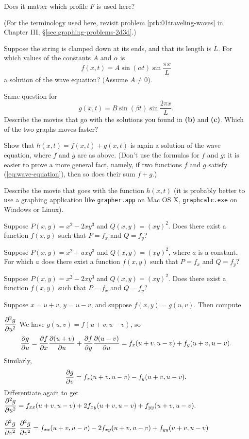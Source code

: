 \begin{multicols}{2}
Does it matter which profile $F$ is used
here?

(For the terminology used here, revisit problem
\ref{prb:01traveling-waves} in Chapter III, \S\ref{sec:graphing-problems-2d3d}.)

\subprob Suppose the string is clamped down at its ends, and that its
length is $L$.  For which values of the constants $A$ and $\alpha$ is
\[
  f(x, t) = A\sin(\alpha t) \sin \frac{\pi x}{L}
\]
a solution of the wave equation?  (Assume $A\neq0$).

\subprob Same question for 
\[
  g(x, t) =  B\sin(\beta t) \sin \frac{2\pi x}{L}.
\]
\subprob Describe the movies that go with the solutions you found in \textbf{(b)} and \textbf{(c)}.  Which of the two graphs moves faster?

\subprob Show that $h(x, t) = f(x, t)+g(x, t)$ is again a solution of the
wave equation, where $f$ and $g$ are as above.  (Don't use the formulas for
$f$ and $g$: it is easier to prove a more general fact, namely, if two
functions $f$ and $g$ satisfy (\ref{eq:wave-equation}), then so does their
sum $f+g$.)


\subprob Describe the movie that goes with the function $h(x,t)$ (it is probably better to use a graphing application like \texttt{grapher.app} on Mac OS X,
\texttt{graphcalc.exe} on Windows or Linux).

\problem Suppose $P(x, y) = x^2-2xy^3$ and $Q(x, y) = (xy)^2$.  Does  
there exist a function $f(x, y)$ such that $P= f_x$ and $Q= f_y$?

\problem Suppose $P(x, y) = x^2+axy^3$ and $Q(x, y) = (xy)^2$, where $a$  
is a constant.  For which $a$ does there exist a function $f(x, y)$ such
that $P= f_x$ and $Q= f_y$?

\problem Suppose $P(x, y) = x^2-2xy^3$ and $Q(x, y) = (xy)^2$.  Does  
there exist a function $f(x, y)$ such that $P= f_x$ and $Q= f_y$?

\problem Suppose $x=u+v$, $y=u-v$, and suppose $f(x, y) = g(u, v)$.  
Then compute

\subprob $\dfrac{\partial^2 g}{\partial u^2}$%
\answer
We have $g(u,v) = f(u+v, u-v)$, so
\[
  \frac{\partial g}{\partial u} = \frac{\partial f}{\partial x} \frac{\partial (u+v)}{\partial u} + \frac{\partial f}{\partial y} \frac{\partial (u-v)}{\partial u}
  = f_x(u+v, u-v)+f_y(u+v, u-v).
\]
Similarly,
\[
  \frac{\partial g}{\partial v} = f_x(u+v, u-v) - f_y(u+v, u-v).
\]
Differentiate again to get
\(\displaystyle
  \frac{\partial^2 g}{\partial u^2}
  = f_{xx}(u+v, u-v)+2f_{xy}(u+v, u-v)+f_{yy}(u+v, u-v).
\)
\endanswer

\subprob $\dfrac{\partial^2 g}{\partial v^2}$
\answer
\(\displaystyle 
\frac{\partial^2 g}{\partial v^2}
= f_{xx}(u+v, u-v)-2f_{xy}(u+v, u-v)+f_{yy}(u+v, u-v)
\)


\end{multicols}
